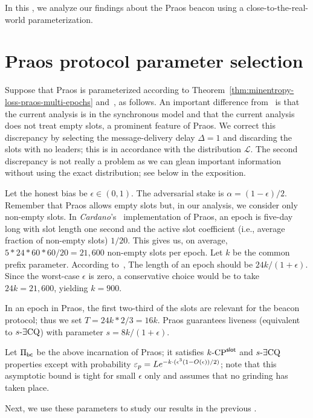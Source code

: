 

In this \Section, 
we analyze our findings about the Praos beacon 
using a close-to-the-real-world parameterization.


\section{Praos protocol parameter selection}\label{sec:praos-params}
Suppose that Praos is parameterized according to 
Theorem~\ref{thm:minentropy-loss-praos-multi-epochs} 
and~\cite[Theorem 9]{Praos}, as follows.
An important difference from~\cite[Theorem 9]{Praos} is that 
the current analysis is in the synchronous model 
and that the current analysis does not treat empty slots, a prominent feature of Praos. 
We correct this discrepancy by selecting the message-delivery delay $\Delta = 1$ 
and discarding the slots with no leaders; 
this is in accordance with the distribution $\mathcal{L}$. 
The second discrepancy is not really a problem 
as we can glean important information without using the exact distribution; 
see below in the exposition.

Let the honest bias be $\epsilon \in (0,1)$.
The adversarial stake is $\alpha = (1-\epsilon)/2$. 
Remember that Praos allows empty slots but, 
in our analysis, we consider only non-empty slots. 
In \emph{Cardano}'s~\cite{Cardano} implementation of Praos, 
an epoch is five-day long with slot length one second 
and the active slot coefficient (i.e., average fraction of non-empty slots)  $1/20$. 
This gives us, on average, $5*24*60*60/20 = 21,600$ non-empty slots per epoch.
Let $k$ be the common prefix parameter.  
According to~\cite[Corollary 3]{Praos}, 
The length of an epoch should be $24 k/(1+\epsilon)$. 
Since the worst-case $\epsilon$ is zero, 
a conservative choice would be to take $24 k = 21,600$, yielding $k = 900$. 


In an epoch in Praos, the first two-third of the slots 
are relevant for the beacon protocol; 
thus we set $T = 24k * 2/3 = 16 k$. 
Praos guarantees liveness (equivalent to ${s}\text{-}\exists\mathrm{CQ}$) 
with parameter $s = 8 k/(1+\epsilon)$. 

Let $\Pi_\mathsf{bc}$ be the above incarnation of Praos; 
it satisfies ${k}\text{-}\mathrm{CP}^{\mathsf{slot}}$ and ${s}\text{-}\exists\mathrm{CQ}$ properties 
except with probability 
$\mathsf{\varepsilon}_p = L e^{-k \cdot (\epsilon^3 (1- O(\epsilon) )/2 )}$; 
note that this asymptotic bound is tight for small $\epsilon$ only 
and assumes that no grinding has taken place.

Next, we use these parameters to study our results in the previous \Section. 







